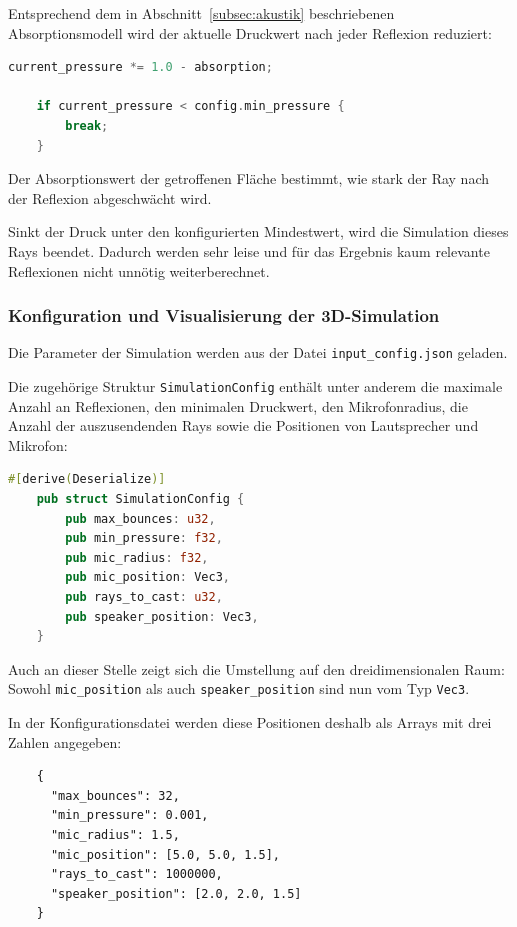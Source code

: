 \documentclass{article}
\begin{document}
    Entsprechend dem in Abschnitt~\ref{subsec:akustik} beschriebenen
    Absorptionsmodell wird der aktuelle Druckwert nach jeder Reflexion reduziert:

    \begin{lstlisting}[language=Rust]
    current_pressure *= 1.0 - absorption;

    if current_pressure < config.min_pressure {
        break;
    }
    \end{lstlisting}

    Der Absorptionswert der getroffenen Fläche bestimmt, wie stark der Ray nach
    der Reflexion abgeschwächt wird.

    Sinkt der Druck unter den konfigurierten Mindestwert, wird die Simulation
    dieses Rays beendet. Dadurch werden sehr leise und für das Ergebnis kaum
    relevante Reflexionen nicht unnötig weiterberechnet.


    \subsubsection{Konfiguration und Visualisierung der 3D-Simulation}
    \label{subsubsec:3d-config-visualization}

    Die Parameter der Simulation werden aus der Datei
    \texttt{input\_config.json} geladen.

    Die zugehörige Struktur \texttt{SimulationConfig} enthält unter anderem die
    maximale Anzahl an Reflexionen, den minimalen Druckwert, den Mikrofonradius,
    die Anzahl der auszusendenden Rays sowie die Positionen von Lautsprecher und
    Mikrofon:

    \begin{lstlisting}[language=Rust]
    #[derive(Deserialize)]
    pub struct SimulationConfig {
        pub max_bounces: u32,
        pub min_pressure: f32,
        pub mic_radius: f32,
        pub mic_position: Vec3,
        pub rays_to_cast: u32,
        pub speaker_position: Vec3,
    }
    \end{lstlisting}

    Auch an dieser Stelle zeigt sich die Umstellung auf den dreidimensionalen
    Raum: Sowohl \texttt{mic\_position} als auch
    \texttt{speaker\_position} sind nun vom Typ \texttt{Vec3}.

    In der Konfigurationsdatei werden diese Positionen deshalb als Arrays mit drei
    Zahlen angegeben:

    \begin{lstlisting}
    {
      "max_bounces": 32,
      "min_pressure": 0.001,
      "mic_radius": 1.5,
      "mic_position": [5.0, 5.0, 1.5],
      "rays_to_cast": 1000000,
      "speaker_position": [2.0, 2.0, 1.5]
    }
    \end{lstlisting}
\end{document}
